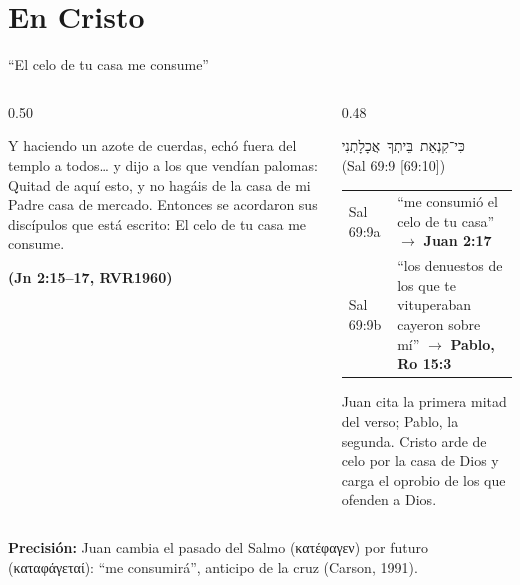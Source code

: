 \documentclass[hyperref={bookmarks=false},aspectratio=169]{beamer}
\newcommand{\heb}[1]{\mbox{\foreignlanguage{hebrew}{#1}}}
\newcommand{\grc}[1]{\foreignlanguage{ancientgreek}{#1}}
\newcommand{\fuente}[1]{\par\hfill{\upshape\bfseries\footnotesize\textcolor{azul}{#1}}}
\newcommand{\precision}[1]{{\footnotesize\color{gris}\textbf{Precisión:} #1}}
\begin{document}
\section{En Cristo}

\begin{frame}{``El celo de tu casa me consume''}
\begin{columns}[t,onlytextwidth]
\begin{column}{0.50\textwidth}
\begin{cita}Y haciendo un azote de cuerdas, echó fuera del templo a todos\ldots{} y dijo a los que vendían palomas: Quitad de aquí esto, y no hagáis de la casa de mi Padre casa de mercado. Entonces se acordaron sus discípulos que está escrito: El celo de tu casa me consume.\fuente{(Jn 2:15--17, RVR1960)}\end{cita}
\end{column}
\begin{column}{0.48\textwidth}
\begin{center}\heb{כִּי־קִנְאַת בֵּיתְךָ אֲכָלָתְנִי}\\ \footnotesize (Sal 69:9 [69:10])\end{center}
\scriptsize\renewcommand{\arraystretch}{1.15}
\begin{tabular}{@{}>{\RaggedRight\arraybackslash}p{1.6cm}>{\RaggedRight\arraybackslash}p{4.0cm}@{}}
\toprule
Sal 69:9a & ``me consumió el celo de tu casa'' $\rightarrow$ \textbf{Juan 2:17} \\
Sal 69:9b & ``los denuestos de los que te vituperaban cayeron sobre mí'' $\rightarrow$ \textbf{Pablo, Ro 15:3} \\
\bottomrule
\end{tabular}\par\smallskip
\small Juan cita la primera mitad del verso; Pablo, la segunda. Cristo arde de celo por la casa de Dios y carga el oprobio de los que ofenden a Dios.
\end{column}
\end{columns}\par\smallskip
\precision{Juan cambia el pasado del Salmo (\grc{κατέφαγεν}) por futuro (\grc{καταφάγεταί}): ``me consumirá'', anticipo de la cruz (Carson, 1991).}
\end{frame}
\end{document}
